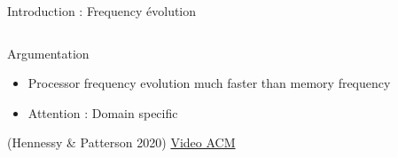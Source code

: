 \begin{Frame}{Introduction : Frequency évolution}
\begin{columns}[t]
\begin{column}{\BW}
\begin{block}{Argumentation}
\begin{itemize}
\item Processor frequency evolution much faster than memory frequency
\item Attention : Domain specific
\end{itemize}
(Hennessy \& Patterson 2020) \href{https://www.youtube.com/watch?v=3LVeEjsn8Ts}{Video ACM}
\end{block}


\end{column}
\begin{column}{\BW}
\begin{block}{}
\end{block}

\end{column}

\end{columns}

\end{Frame}

